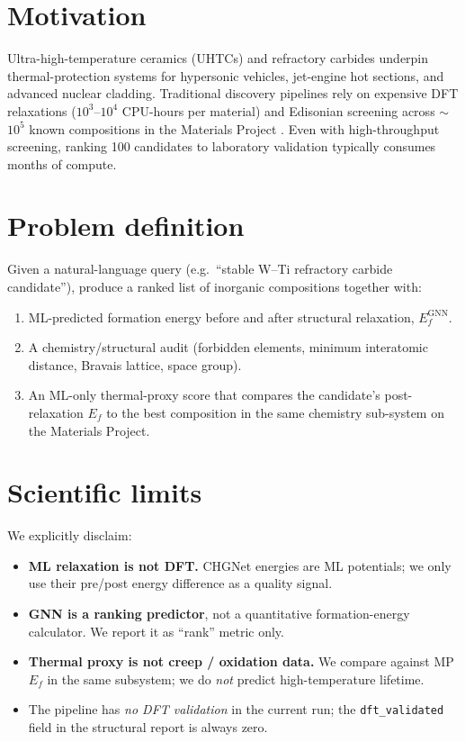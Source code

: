 \documentclass[11pt,a4paper]{report}
\begin{document}
\section{Motivation}

Ultra-high-temperature ceramics (UHTCs) and refractory carbides underpin thermal-protection
systems for hypersonic vehicles, jet-engine hot sections, and advanced nuclear cladding.
Traditional discovery pipelines rely on expensive DFT relaxations ($10^3$--$10^4$ CPU-hours
per material) and Edisonian screening across $\sim$$10^5$ known compositions in the Materials
Project \cite{jain2013mp}. Even with high-throughput screening, ranking 100 candidates to
laboratory validation typically consumes months of compute.

\section{Problem definition}

Given a natural-language query (e.g.\ ``stable W--Ti refractory carbide candidate''), produce
a ranked list of inorganic compositions together with:
\begin{enumerate}[leftmargin=*,itemsep=2pt]
\item ML-predicted formation energy before and after structural relaxation, $E_f^{\text{GNN}}$.
\item A chemistry/structural audit (forbidden elements, minimum interatomic distance, Bravais
      lattice, space group).
\item An ML-only thermal-proxy score that compares the candidate's post-relaxation $E_f$ to
      the best composition in the same chemistry sub-system on the Materials Project.
\end{enumerate}

\section{Scientific limits}

We explicitly disclaim:
\begin{itemize}[leftmargin=*,itemsep=2pt]
\item \textbf{ML relaxation is not DFT.} CHGNet energies are ML potentials; we only use
      their pre/post energy difference as a quality signal.
\item \textbf{GNN is a ranking predictor}, not a quantitative formation-energy calculator.
      We report it as ``rank'' metric only.
\item \textbf{Thermal proxy is not creep / oxidation data.} We compare against MP $E_f$ in
      the same subsystem; we do \emph{not} predict high-temperature lifetime.
\item The pipeline has \emph{no DFT validation} in the current run; the
      \texttt{dft\_validated} field in the structural report is always zero.
\end{itemize}
\end{document}
